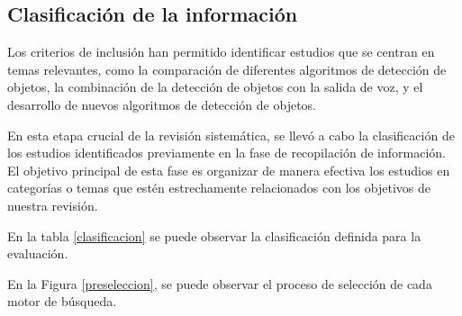 \documentclass[letterpaper]{article}
\begin{document}
  \subsection{Clasificación de la información}
  Los criterios de inclusión han permitido identificar estudios que se centran en temas relevantes, como la comparación de diferentes algoritmos de detección de objetos, la combinación de la detección de objetos con la salida de voz, y el desarrollo de nuevos algoritmos de detección de objetos. 

En esta etapa crucial de la revisión sistemática, se llevó a cabo la clasificación de los estudios identificados previamente en la fase de recopilación de información. El objetivo principal de esta fase es organizar de manera efectiva los estudios en categorías o temas que estén estrechamente relacionados con los objetivos de nuestra revisión.

En la tabla \ref{clasificacion} se puede observar la clasificación definida para la evaluación.

\begin{table}[hbtp]
    \centering
    \caption{Resultados por categoría en diferentes bases de datos.}
    \label{clasificacion}
\end{table}

En la Figura \ref{preseleccion}, se puede observar el proceso de selección de cada motor de búsqueda.
\end{document}
